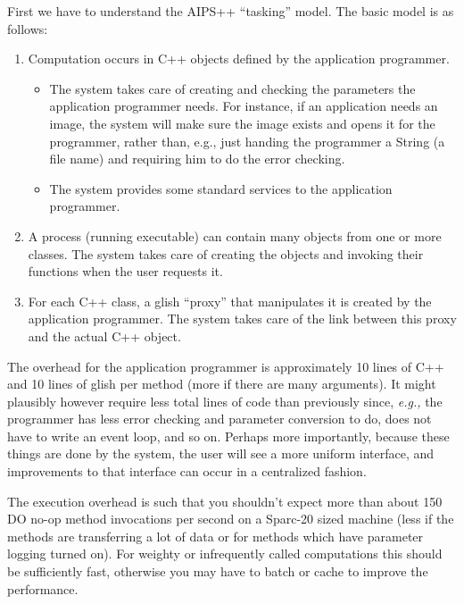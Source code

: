 First we have to understand the AIPS++ ``tasking'' model.  The basic
model is as follows:
\begin{enumerate}
    \item Computation occurs in C++ objects defined by the application
          programmer.
     \begin{itemize}
         \item The system takes care of creating and checking the 
               parameters the application programmer needs. For instance,
               if an application needs an image, the system will make sure
               the image exists and opens it for the programmer, rather
               than, e.g., just handing the programmer a String (a file name)
               and requiring him to do the error checking.
         \item The system provides some standard services to the application
               programmer.
     \end{itemize}
    \item A process (running executable) can contain many objects from
          one or more classes. The system takes care of creating the
          objects and invoking their functions when the user requests
          it.
    \item For each C++ class, a glish ``proxy'' that manipulates it
          is created by the application programmer. The system takes
          care of the link between this proxy and the actual C++ object.
\end{enumerate}

The overhead for the application programmer is approximately 10 lines
of C++ and 10 lines of glish per method (more if there are many
arguments). It might plausibly however require less total lines of
code than previously since, {\em e.g.,} the programmer has less error
checking and parameter conversion to do, does not have to write an
event loop, and so on. Perhaps more importantly, because these things
are done by the system, the user will see a more uniform interface,
and improvements to that interface can occur in a centralized fashion.

The execution overhead is such that you shouldn't expect more than
about 150 DO no-op method invocations per second on a Sparc-20 sized
machine (less if the methods are transferring a lot of data or for
methods which have parameter logging turned on). For weighty or
infrequently called computations this should be sufficiently fast,
otherwise you may have to batch or cache to improve the performance.

